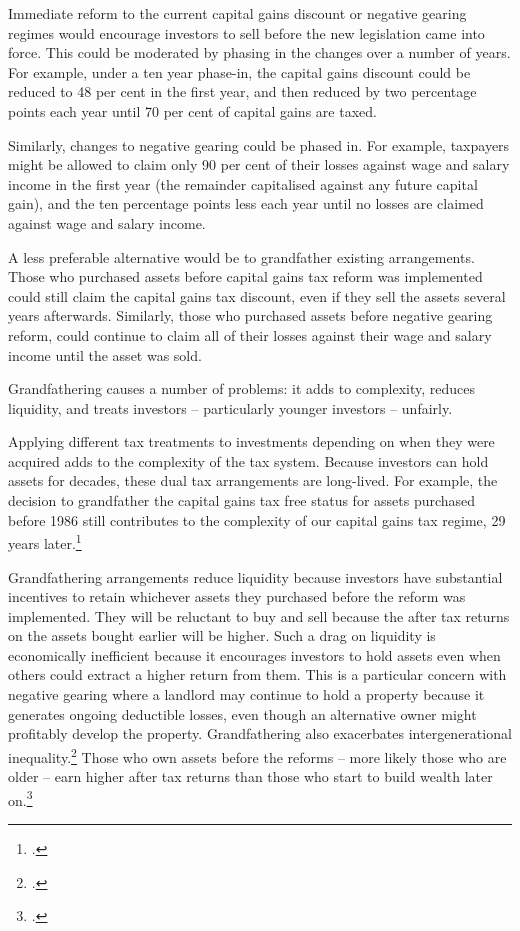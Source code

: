 \documentclass{grattan}\usepackage[]{graphicx}\usepackage[]{color}
\begin{document}
Immediate reform to the current capital gains discount or negative gearing regimes would encourage investors to sell before the new legislation came into force. This could be moderated by phasing in the changes over a number of years. For example, under a ten year phase-in, the capital gains discount could be reduced to 48 per cent in the first year, and then reduced by two percentage points each year until 70 per cent of capital gains are taxed. 

Similarly, changes to negative gearing could be phased in. For example, taxpayers might be allowed to claim only 90 per cent of their losses against wage and salary income in the first year (the remainder capitalised against any future capital gain), and the ten percentage points less each year until no losses are claimed against wage and salary income.

A less preferable alternative would be to grandfather existing arrangements. Those who purchased assets before capital gains tax reform was implemented could still claim the capital gains tax discount, even if they sell the assets several years afterwards. Similarly, those who purchased assets before negative gearing reform, could continue to claim all of their losses against their wage and salary income until the asset was sold.

Grandfathering causes a number of problems: it adds to complexity, reduces liquidity, and treats investors -- particularly younger investors -- unfairly.

Applying different tax treatments to investments depending on when they were acquired adds to the complexity of the tax system. Because investors can hold assets for decades, these dual tax arrangements are long-lived.  For example, the decision to grandfather the capital gains tax free status for assets purchased before 1986 still contributes to the complexity of our capital gains tax regime, 29 years later.\footcite[p.~75]{Treasury2010} 

Grandfathering arrangements reduce liquidity because investors have substantial incentives to retain whichever assets they purchased before the reform was implemented. They will be reluctant to buy and sell because the after tax returns on the assets bought earlier will be higher. Such a drag on liquidity is economically inefficient because it encourages investors to hold assets even when others could extract a higher return from them. This is a particular concern with negative gearing where a landlord may continue to hold a property because it generates ongoing deductible losses, even though an alternative owner might profitably develop the property. Grandfathering also exacerbates intergenerational inequality.\footcite{Daley2014}  Those who own assets before the reforms -- more likely those who are older -- earn higher after tax returns than those who start to build wealth later on.\footcite[p.~14]{Daley2014} 
\end{document}
